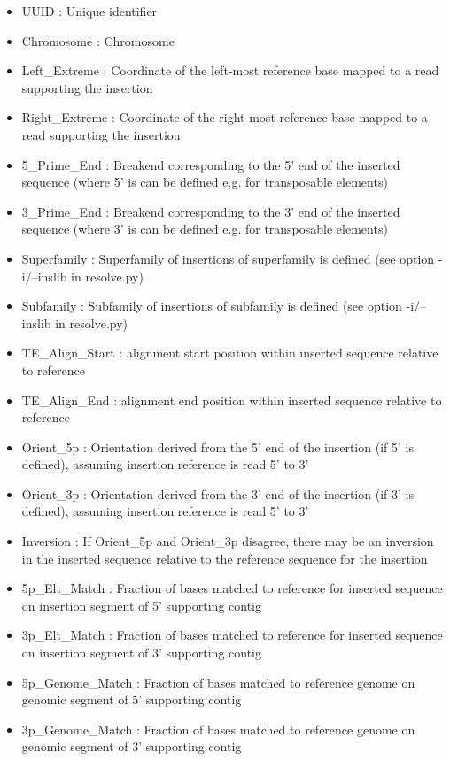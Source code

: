 \documentclass[letterpaper,11pt]{article}
\begin{document}
\begin{itemize}
\item UUID : Unique identifier
\item Chromosome : Chromosome
\item Left\_Extreme : Coordinate of the left-most reference base mapped to a read supporting the insertion
\item Right\_Extreme : Coordinate of the right-most reference base mapped to a read supporting the insertion
\item 5\_Prime\_End : Breakend corresponding to the 5' end of the inserted sequence (where 5' is can be defined e.g. for transposable elements)
\item 3\_Prime\_End : Breakend corresponding to the 3' end of the inserted sequence (where 3' is can be defined e.g. for transposable elements)
\item Superfamily : Superfamily of insertions of superfamily is defined (see option -i/--inslib in resolve.py)
\item Subfamily : Subfamily of insertions of subfamily is defined (see option -i/--inslib in resolve.py)
\item TE\_Align\_Start : alignment start position within inserted sequence relative to reference
\item TE\_Align\_End : alignment end position within inserted sequence relative to reference
\item Orient\_5p : Orientation derived from the 5' end of the insertion (if 5' is defined), assuming insertion reference is read 5' to 3'
\item Orient\_3p : Orientation derived from the 3' end of the insertion (if 3' is defined), assuming insertion reference is read 5' to 3'
\item Inversion : If Orient\_5p and Orient\_3p disagree, there may be an inversion in the inserted sequence relative to the reference sequence for the insertion
\item 5p\_Elt\_Match : Fraction of bases matched to reference for inserted sequence on insertion segment of 5' supporting contig
\item 3p\_Elt\_Match : Fraction of bases matched to reference for inserted sequence on insertion segment of 3' supporting contig
\item 5p\_Genome\_Match : Fraction of bases matched to reference genome on genomic segment of 5' supporting contig
\item 3p\_Genome\_Match : Fraction of bases matched to reference genome on genomic segment of 3' supporting contig

\end{itemize}
\end{document}
